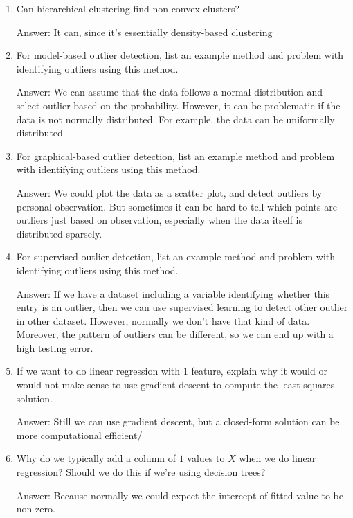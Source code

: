 \documentclass{article}
\newenvironment{answer}{\par\begingroup\color{gre}Answer: }{\endgroup}
\begin{document}
\begin{enumerate}
\begin{answer}
\end{answer}
\item Can hierarchical clustering find non-convex clusters?
\begin{answer}
	It can, since it's essentially density-based clustering
\end{answer}
\item For model-based outlier detection, list an example method and problem with identifying outliers using this method.
\begin{answer}
	We can assume that the data follows a normal distribution and select outlier based on the probability. However, it can be problematic if the data is not normally distributed. For example, the data can be uniformally distributed 
\end{answer}
\item For graphical-based outlier detection, list an example method and problem with identifying outliers using this method.
\begin{answer}
	We could plot the data as a scatter plot, and detect outliers by personal observation. But sometimes it can be hard to tell which points are outliers just based on observation, especially when the data itself is distributed sparsely. 
\end{answer}
\item For supervised outlier detection, list an example method and problem with identifying outliers using this method.
\begin{answer}
	If we have a dataset including a variable identifying whether this entry is an outlier, then we can use supervised learning to detect other outlier in other dataset. However, normally we don't have that kind of data. Moreover, the pattern of outliers can be different, so we can end up with a high testing error.
\end{answer}
\item If we want to do linear regression with 1 feature, explain why it would or would not make sense to use gradient descent to compute the least squares solution.
\begin{answer}
	Still we can use gradient descent, but a closed-form solution can be more computational efficient/
\end{answer}
\item Why do we typically add a column of $1$ values to $X$ when we do linear regression? Should we do this if we're using decision trees?
\begin{answer}
	Because normally we could expect the intercept of fitted value to be non-zero.

\end{answer}
\end{enumerate}
\end{document}
